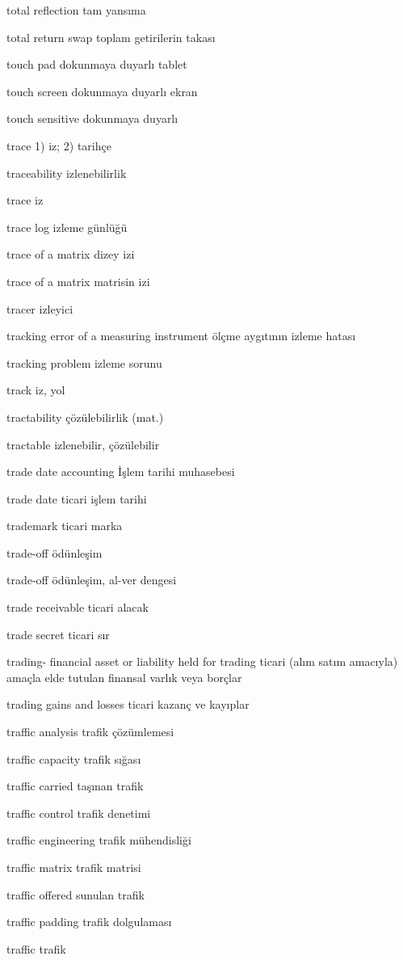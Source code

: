\documentclass[12pt,fleqn]{article}\usepackage{../../common}
\begin{document}
total reflection tam yansıma

total return swap toplam getirilerin takası

touch pad dokunmaya duyarlı tablet

touch screen dokunmaya duyarlı ekran

touch sensitive dokunmaya duyarlı

trace 1) iz; 2) tarihçe

traceability izlenebilirlik

trace iz

trace log izleme günlüğü

trace of a matrix dizey izi

trace of a matrix matrisin izi

tracer izleyici

tracking error of a measuring instrument ölçme aygıtının izleme hatası

tracking problem izleme sorunu

track iz, yol

tractability çözülebilirlik (mat.)

tractable izlenebilir, çözülebilir

trade date accounting İşlem tarihi muhasebesi

trade date ticari işlem tarihi

trademark ticari marka

trade-off ödünleşim

trade-off ödünleşim, al-ver dengesi

trade receivable ticari alacak

trade secret ticari sır

trading- financial asset or liability held for trading ticari (alım satım amacıyla) amaçla elde tutulan finansal varlık veya borçlar

trading gains and losses ticari kazanç ve kayıplar

traffic analysis trafik çözümlemesi

traffic capacity trafik sığası

traffic carried taşınan trafik

traffic control trafik denetimi

traffic engineering trafik mühendisliği

traffic matrix trafik matrisi

traffic offered sunulan trafik

traffic padding trafik dolgulaması

traffic trafik
\end{document}
